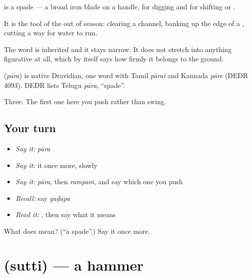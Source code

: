  is a spade — a broad iron blade on a handle, for digging and for shifting  or .

It is the tool of the  out of season: clearing a channel, banking up the edge of a , cutting a way for water to run.

The word is inherited and it stays narrow. It does not stretch into anything figurative at all, which by itself says how firmly it belongs to the ground.

\begin{cousinweb}
\textbf{} (\emph{pāra}) is native Dravidian, one word with Tamil \emph{pārai} and Kannada \emph{pāre} (DEDR 4093). DEDR lists Telugu \emph{pāra}, \textquotedblleft{}spade\textquotedblright{}.
\end{cousinweb}

\begin{grammarlens}[title={What you've built}]
Three. The first one here you push rather than swing.
\end{grammarlens}

\subsection*{Your turn}
\begin{itemize}
\raggedright
  \item \emph{Say it:} \emph{pāra}
  \item \emph{Say it:} it once more, slowly
  \item \emph{Say it:} \emph{pāra}, then \emph{rampaṁ}, and say which one you push
  \item \emph{Recall:} say \emph{gaḍapa}
  \item \emph{Read it:} \textbf{}, then say what it means
\end{itemize}

\begin{tcolorbox}[breakable,colback=teal!4,colframe=teal!35!black,title={Before you move on}]
What does  mean? (\textquotedblleft{}a spade\textquotedblright{}.) Say it once more.
\end{tcolorbox}
\section[\texorpdfstring{\te{సుత్తి} (sutti)}{సుత్తి (sutti)}]{ (sutti) — a hammer}

\label{lesson:TE-C69-hammer}



